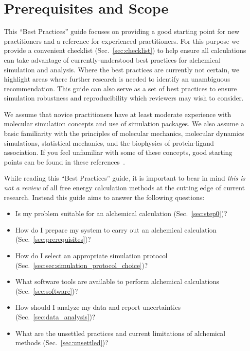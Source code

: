 \documentclass[9pt,bestpractices]{livecoms}
\begin{document}
\section{Prerequisites and Scope}
\label{sec:pre}

This ``Best Practices'' guide focuses on providing a good starting point for new practitioners and a reference for experienced practitioners. 
For this purpose we provide a convenient checklist (Sec.~\ref{sec:checklist}) to help ensure all calculations can take advantage of currently-understood best practices for alchemical simulation and analysis. Where the best practices are currently not certain, we highlight areas where further research is needed to identify an unambiguous recommendation.
This guide can also serve as a set of best practices to ensure simulation robustness and reproducibility which reviewers may wish to consider.

We assume that novice practitioners have at least moderate experience with molecular simulation concepts and use of simulation packages. 
We also assume a basic familiarity with the principles of molecular mechanics, molecular dynamics simulations, statistical mechanics, and the biophysics of protein-ligand association. If you feel unfamiliar with some of these concepts, good starting points can be found in these references~\cite{braun2019best, grossfield2018best, klimovich2015guidelines, shirts2012best}. 

 While reading this ``Best Practices'' guide, it is important to bear in mind \emph{this is not a review} of all free energy calculation methods at the cutting edge of current research.
Instead this guide aims to answer the following questions:
\begin{itemize}
    \item Is my problem suitable for an alchemical calculation (Sec.~\ref{sec:step0})? 
     \item How do I prepare my system to carry out an alchemical calculation (Sec.~\ref{sec:prerequisites})?
     \item How do I select an appropriate simulation protocol (Sec.~\ref{sec:sec:simulation_protocol_choice})? 
     \item What software tools are available to perform alchemical calculations (Sec.~\ref{sec:software})? 
     \item How should I analyze my data and report uncertainties (Sec.~\ref{sec:data_analysis})?
     \item What are the unsettled practices and current limitations of alchemical methods (Sec.~\ref{sec:unsettled})?
\end{itemize}
\end{document}
